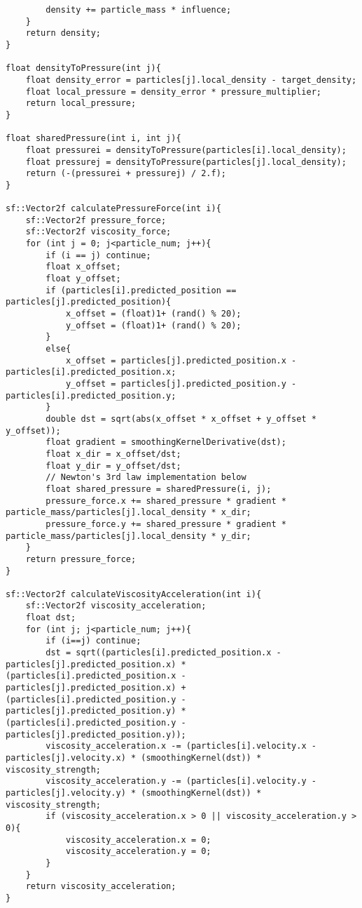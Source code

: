 \documentclass[write-up.tex]{subfiles}
\begin{document}
\begin{appendices}
\begin{lstlisting}
        density += particle_mass * influence;
    }
    return density;
}

float densityToPressure(int j){
    float density_error = particles[j].local_density - target_density;
    float local_pressure = density_error * pressure_multiplier;
    return local_pressure;
}

float sharedPressure(int i, int j){
    float pressurei = densityToPressure(particles[i].local_density);
    float pressurej = densityToPressure(particles[j].local_density);
    return (-(pressurei + pressurej) / 2.f);
}

sf::Vector2f calculatePressureForce(int i){
    sf::Vector2f pressure_force;
    sf::Vector2f viscosity_force;
    for (int j = 0; j<particle_num; j++){
        if (i == j) continue;
        float x_offset;
        float y_offset;
        if (particles[i].predicted_position == particles[j].predicted_position){
            x_offset = (float)1+ (rand() % 20);
            y_offset = (float)1+ (rand() % 20);
        }
        else{
            x_offset = particles[j].predicted_position.x - particles[i].predicted_position.x;
            y_offset = particles[j].predicted_position.y - particles[i].predicted_position.y;
        }
        double dst = sqrt(abs(x_offset * x_offset + y_offset * y_offset));
        float gradient = smoothingKernelDerivative(dst);
        float x_dir = x_offset/dst;
        float y_dir = y_offset/dst;
        // Newton's 3rd law implementation below
        float shared_pressure = sharedPressure(i, j);
        pressure_force.x += shared_pressure * gradient * particle_mass/particles[j].local_density * x_dir;
        pressure_force.y += shared_pressure * gradient * particle_mass/particles[j].local_density * y_dir;
    }
    return pressure_force;
}

sf::Vector2f calculateViscosityAcceleration(int i){
    sf::Vector2f viscosity_acceleration;
    float dst;
    for (int j; j<particle_num; j++){
        if (i==j) continue;
        dst = sqrt((particles[i].predicted_position.x - particles[j].predicted_position.x) * (particles[i].predicted_position.x - particles[j].predicted_position.x) + (particles[i].predicted_position.y - particles[j].predicted_position.y) * (particles[i].predicted_position.y - particles[j].predicted_position.y));
        viscosity_acceleration.x -= (particles[i].velocity.x - particles[j].velocity.x) * (smoothingKernel(dst)) * viscosity_strength;
        viscosity_acceleration.y -= (particles[i].velocity.y - particles[j].velocity.y) * (smoothingKernel(dst)) * viscosity_strength;
        if (viscosity_acceleration.x > 0 || viscosity_acceleration.y > 0){
            viscosity_acceleration.x = 0;
            viscosity_acceleration.y = 0;
        }
    }
    return viscosity_acceleration;
}


\end{lstlisting}
\end{appendices}
\end{document}
